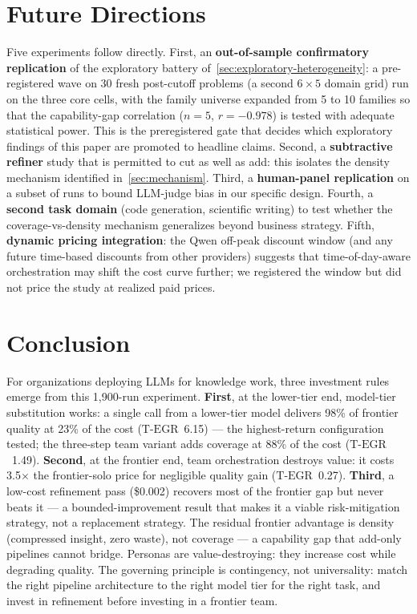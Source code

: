 \documentclass[12pt,a4paper]{article}
\newcommand{\TEGR}{\ensuremath{\text{T-EGR}}}
\begin{document}
\section{Future Directions}\label{sec:future}

Five experiments follow directly. First, an \textbf{out-of-sample confirmatory
replication} of the exploratory battery of~\cref{sec:exploratory-heterogeneity}:
a pre-registered wave on 30 fresh post-cutoff problems (a second $6\times5$
domain grid) run on the three core cells, with the family universe expanded
from 5 to 10 families so that the capability-gap correlation ($n = 5$,
$r = -0.978$) is tested with adequate statistical power. This is the
preregistered gate that decides which exploratory findings of this paper are
promoted to headline claims. Second, a \textbf{subtractive refiner} study
that is permitted to cut as well as add: this isolates the density mechanism
identified in~\cref{sec:mechanism}. Third, a \textbf{human-panel replication}
on a subset of runs to bound LLM-judge bias in our specific design. Fourth, a
\textbf{second task domain} (code generation, scientific writing) to test
whether the coverage-vs-density mechanism generalizes beyond business strategy.
Fifth, \textbf{dynamic pricing integration}: the Qwen off-peak discount
window (and any future time-based discounts from other providers) suggests
that time-of-day-aware orchestration may
shift the cost curve further; we registered the window but did not price the
study at realized paid prices.

\section{Conclusion}\label{sec:conclusion}

For organizations deploying LLMs for knowledge work, three investment rules
emerge from this 1{,}900-run experiment. \textbf{First}, at the lower-tier end,
model-tier substitution works: a single call from a lower-tier model
delivers 98\% of frontier quality at 23\% of the cost ($\TEGR$~6.15) --- the
highest-return configuration tested; the three-step team variant adds coverage
at 88\% of the cost ($\TEGR$~1.49). \textbf{Second}, at the frontier end, team
orchestration destroys value: it costs 3.5$\times$ the frontier-solo price for
negligible quality gain ($\TEGR$~0.27). \textbf{Third}, a low-cost refinement pass
(\$0.002) recovers most of the frontier gap but never beats it --- a
bounded-improvement result that makes it a viable risk-mitigation strategy, not
a replacement strategy. The residual frontier advantage is density (compressed
insight, zero waste), not coverage --- a capability gap that add-only pipelines
cannot bridge. Personas are value-destroying: they increase cost while degrading
quality. The governing principle is contingency, not universality: match the
right pipeline architecture to the right model tier for the right task, and
invest in refinement before investing in a frontier team.
\end{document}

